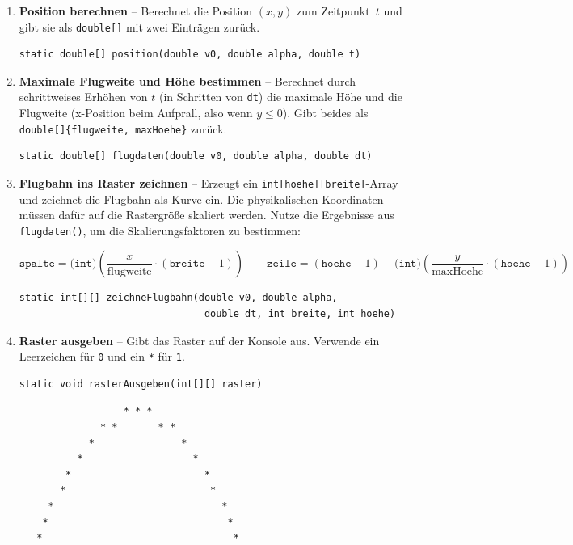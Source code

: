 \documentclass[
	fontsize=12pt,          %
	paper=a4,               %
	numbers=noenddot,       %
	listof=totoc,           %
	listof=entryprefix,     %
	listof=nochaptergap,    %
	bibliography=totoc,     %
	parskip=half            %
	openany                 %
]{scrbook}
\begin{document}
\begin{enumerate}[label=\textbf{\alph*)}]

\item \textbf{Position berechnen} -- Berechnet die Position $(x, y)$ zum Zeitpunkt~$t$ und gibt sie als \texttt{double[]} mit zwei Einträgen zurück.

\begin{lstlisting}
static double[] position(double v0, double alpha, double t)
\end{lstlisting}

\item \textbf{Maximale Flugweite und Höhe bestimmen} -- Berechnet durch schrittweises Erhöhen von $t$ (in Schritten von \texttt{dt}) die maximale Höhe und die Flugweite (x-Position beim Aufprall, also wenn $y \leq 0$). Gibt beides als \texttt{double[]\{flugweite, maxHoehe\}} zurück.

\begin{lstlisting}
static double[] flugdaten(double v0, double alpha, double dt)
\end{lstlisting}

\item \textbf{Flugbahn ins Raster zeichnen} -- Erzeugt ein \texttt{int[hoehe][breite]}-Array und zeichnet die Flugbahn als Kurve ein. Die physikalischen Koordinaten müssen dafür auf die Rastergröße skaliert werden. Nutze die Ergebnisse aus \texttt{flugdaten()}, um die Skalierungsfaktoren zu bestimmen:

\[
	\texttt{spalte} = \texttt{(int)}\left(\frac{x}{\text{flugweite}} \cdot (\texttt{breite} - 1)\right)
	\qquad
	\texttt{zeile} = (\texttt{hoehe} - 1) - \texttt{(int)}\left(\frac{y}{\text{maxHoehe}} \cdot (\texttt{hoehe} - 1)\right)
\]

\begin{lstlisting}
static int[][] zeichneFlugbahn(double v0, double alpha,
                                double dt, int breite, int hoehe)
\end{lstlisting}

\item \textbf{Raster ausgeben} -- Gibt das Raster auf der Konsole aus. Verwende ein Leerzeichen für \texttt{0} und ein \texttt{*} für \texttt{1}.

\begin{lstlisting}
static void rasterAusgeben(int[][] raster)
\end{lstlisting}

\begin{beispiel}[Mögliche Ausgabe ($v_0 = 20$, $\alpha = 45°$, Raster $60 \times 20$)]
\begin{verbatim}
                  * * *
              * *       * *
            *               *
          *                   *
        *                       *
       *                         *
     *                             *
    *                               *
   *                                 *


\end{verbatim}
\end{beispiel}
\end{enumerate}
\end{document}
